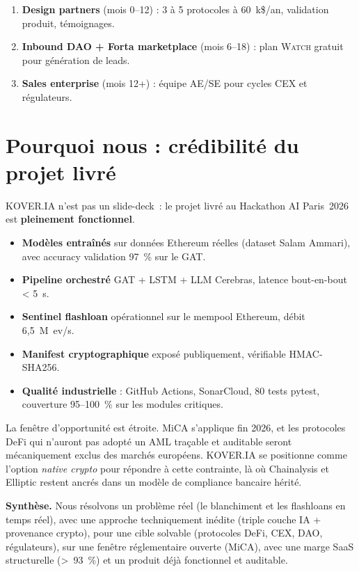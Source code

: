 \documentclass[11pt,a4paper]{article}
\begin{document}
\begin{enumerate}
  \item \textbf{Design partners} (mois 0--12) : 3 à 5 protocoles à
        60~k\$/an, validation produit, témoignages.
  \item \textbf{Inbound DAO + Forta marketplace} (mois 6--18) :
        plan \textsc{Watch} gratuit pour génération de leads.
  \item \textbf{Sales enterprise} (mois 12+) : équipe AE/SE pour
        cycles CEX et régulateurs.
\end{enumerate}

\section{Pourquoi nous : crédibilité du projet livré}

\textsc{KOVER.IA} n'est pas un slide-deck~: le projet livré au
Hackathon AI Paris~2026 est \textbf{pleinement fonctionnel}.

\begin{itemize}
  \item \textbf{Modèles entraînés} sur données Ethereum réelles (dataset
        Salam Ammari), avec accuracy validation 97~\% sur le GAT.
  \item \textbf{Pipeline orchestré} GAT + LSTM + LLM Cerebras, latence
        bout-en-bout < 5~s.
  \item \textbf{Sentinel flashloan} opérationnel sur le mempool
        Ethereum, débit 6,5~M~ev/s.
  \item \textbf{Manifest cryptographique} exposé publiquement,
        vérifiable HMAC-SHA256.
  \item \textbf{Qualité industrielle} : GitHub Actions, SonarCloud,
        80 tests pytest, couverture 95--100~\% sur les modules
        critiques.
\end{itemize}

\begin{quote_kv}
La fenêtre d'opportunité est étroite. MiCA s'applique fin 2026, et les
protocoles DeFi qui n'auront pas adopté un AML traçable et auditable
seront mécaniquement exclus des marchés européens. \textsc{KOVER.IA}
se positionne comme l'option \emph{native crypto} pour répondre à
cette contrainte, là où Chainalysis et Elliptic restent ancrés dans un
modèle de compliance bancaire hérité.
\end{quote_kv}

\begin{insight}
\textbf{Synthèse.} Nous résolvons un problème réel (le blanchiment et
les flashloans en temps réel), avec une approche techniquement inédite
(triple couche IA + provenance crypto), pour une cible solvable
(protocoles DeFi, CEX, DAO, régulateurs), sur une fenêtre
réglementaire ouverte (MiCA), avec une marge SaaS structurelle (>~93~\%)
et un produit déjà fonctionnel et auditable.
\end{insight}
\end{document}
